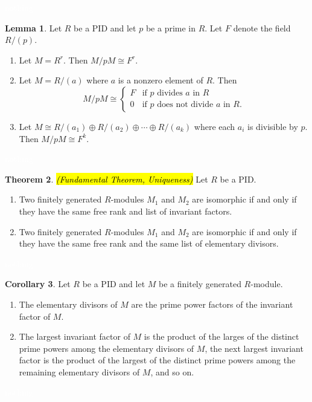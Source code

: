 \documentclass{article}
\theoremstyle{definition}
\newtheorem{thm}{Theorem}[section]
\newtheorem{lem}[thm]{Lemma}
\newtheorem{cor}[thm]{Corollary}
\newcommand{\nl}{\textcolor{white}{nothing}}
\begin{document}
\nl

\begin{lem}
Let $R$ be a PID and let $p$ be a prime in $R$. Let $F$ denote the field $R/(p)$.
\begin{enumerate}
\item Let $M = R^r$. Then $M/pM \cong F^r$.
\item Let $M = R/(a)$ where $a$ is a nonzero element of $R$. Then 
\[M/pM \cong \begin{cases}F & \text{if $p$ divides $a$ in $R$}\\ 0 &\text{if $p$ does not divide $a$ in $R$.}\end{cases}\]
\item Let $M\cong R/(a_1)\oplus R/(a_2)\oplus \cdots \oplus R/(a_k)$ where each $a_i$ is divisible by $p$. Then $M/pM \cong F^k$.
\end{enumerate}
\end{lem}

\nl

\begin{thm}\hl{\textit{(Fundamental Theorem, Uniqueness)}}
Let $R$ be a PID.
\begin{enumerate}
\item Two finitely generated $R$-modules $M_1$ and $M_2$ are isomorphic if and only if they have the same free rank and list of invariant factors.
\item Two finitely generated $R$-modules $M_1$ and $M_2$ are isomorphic if and only if they have the same free rank and the same list of elementary divisors.
\end{enumerate}
\end{thm}

\nl

\begin{cor}
Let $R$ be a PID and let $M$ be a finitely generated $R$-module.
\begin{enumerate}
\item The elementary divisors of $M$ are the prime power factors of the invariant factor of $M$.
\item The largest invariant factor of $M$ is the product of the larges of the distinct prime powers among the elementary divisors of $M$, the next largest invariant factor is the product of the largest of the distinct prime powers among the remaining elementary divisors of $M$, and so on.
\end{enumerate}
\end{cor}

\nl
\end{document}
